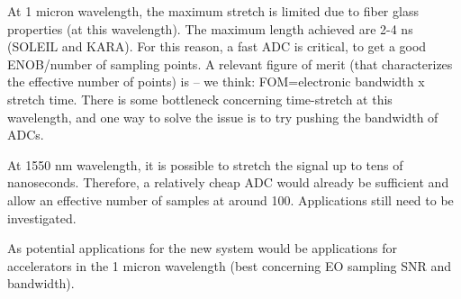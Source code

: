 At 1 micron wavelength, the maximum stretch is limited due to fiber glass properties (at this wavelength). The maximum length achieved are 2-4 ns (SOLEIL and KARA). For this reason, a fast ADC is critical, to get a good ENOB/number of sampling points. A relevant figure of merit (that characterizes the effective number of points) is -- we think: FOM=electronic bandwidth x stretch time. There is some bottleneck concerning time-stretch at this wavelength, and one way to solve the issue is to try pushing the bandwidth of ADCs.

At 1550 nm wavelength, it is possible to stretch the signal up to tens of nanoseconds. Therefore, a relatively cheap ADC would already be sufficient and allow an effective number of samples at around 100. Applications still need to be investigated.

As potential applications for the new system would be applications for accelerators in the 1 micron wavelength (best concerning EO sampling SNR and bandwidth).

